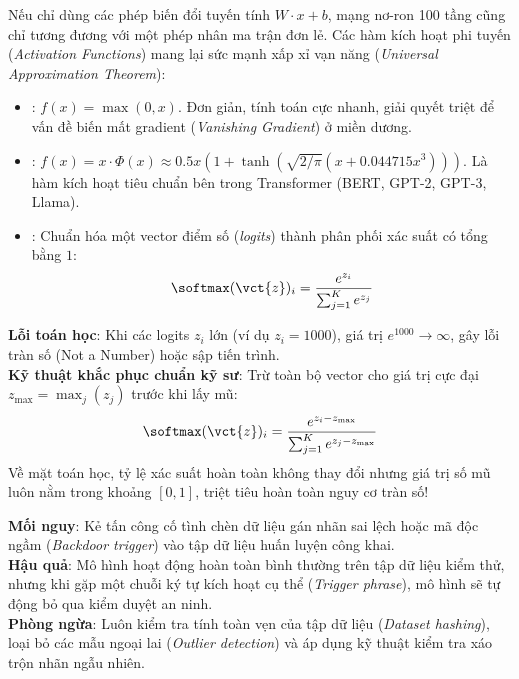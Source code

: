 \begin{workedexamplebox}
Nếu chỉ dùng các phép biến đổi tuyến tính $W \cdot x + b$, mạng nơ-ron 100 tầng cũng chỉ tương đương với một phép nhân ma trận đơn lẻ. Các hàm kích hoạt phi tuyến (\textit{Activation Functions}) mang lại sức mạnh xấp xỉ vạn năng (\textit{Universal Approximation Theorem}):
\begin{itemize}
  \item {}: $f(x) = \max(0, x)$. Đơn giản, tính toán cực nhanh, giải quyết triệt để vấn đề biến mất gradient (\textit{Vanishing Gradient}) ở miền dương.
  \item {}: $f(x) = x \cdot \Phi(x) \approx 0.5x(1 + \tanh(\sqrt{2/\pi}(x + 0.044715x^3)))$. Là hàm kích hoạt tiêu chuẩn bên trong Transformer (BERT, GPT-2, GPT-3, Llama).
  \item {}: Chuẩn hóa một vector điểm số (\textit{logits}) thành phân phối xác suất có tổng bằng $1$:
  \[
  \softmax(\vct{z})_i = \frac{e^{z_i}}{\sum_{j=1}^K e^{z_j}}
  \]
\end{itemize}
\end{workedexamplebox}

\begin{debugbox}
\textbf{Lỗi toán học}: Khi các logits $z_i$ lớn (ví dụ $z_i = 1000$), giá trị $e^{1000} \rightarrow \infty$, gây lỗi tràn số  (Not a Number) hoặc sập tiến trình.\\
\textbf{Kỹ thuật khắc phục chuẩn kỹ sư}: Trừ toàn bộ vector cho giá trị cực đại $z_{\max} = \max_j(z_j)$ trước khi lấy mũ:
\[
\softmax(\vct{z})_i = \frac{e^{z_i - z_{\max}}}{\sum_{j=1}^K e^{z_j - z_{\max}}}
\]
Về mặt toán học, tỷ lệ xác suất hoàn toàn không thay đổi nhưng giá trị số mũ luôn nằm trong khoảng $[0, 1]$, triệt tiêu hoàn toàn nguy cơ tràn số!
\end{debugbox}

\begin{securitybox}
\textbf{Mối nguy}: Kẻ tấn công cố tình chèn dữ liệu gán nhãn sai lệch hoặc mã độc ngầm (\textit{Backdoor trigger}) vào tập dữ liệu huấn luyện công khai.\\
\textbf{Hậu quả}: Mô hình hoạt động hoàn toàn bình thường trên tập dữ liệu kiểm thử, nhưng khi gặp một chuỗi ký tự kích hoạt cụ thể (\textit{Trigger phrase}), mô hình sẽ tự động bỏ qua kiểm duyệt an ninh.\\
\textbf{Phòng ngừa}: Luôn kiểm tra tính toàn vẹn của tập dữ liệu (\textit{Dataset hashing}), loại bỏ các mẫu ngoại lai (\textit{Outlier detection}) và áp dụng kỹ thuật kiểm tra xáo trộn nhãn ngẫu nhiên.
\end{securitybox}

